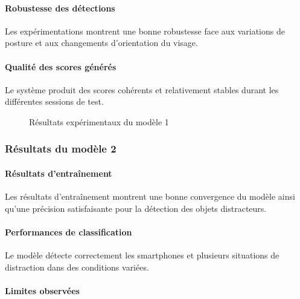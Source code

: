 \paragraph{Robustesse des détections}

Les expérimentations montrent une bonne robustesse face aux variations de posture et aux changements d’orientation du visage.


\paragraph{Qualité des scores générés}

Le système produit des scores cohérents et relativement stables durant les différentes sessions de test.

\begin{figure}[H]
    \centering
    \caption{Résultats expérimentaux du modèle 1}
    \label{fig:results_model1}
\end{figure}

\subsubsection{Résultats du modèle 2}

\paragraph{Résultats d’entraînement}

Les résultats d’entraînement montrent une bonne convergence du modèle ainsi qu’une précision satisfaisante pour la détection des objets distracteurs.


\paragraph{Performances de classification}

Le modèle détecte correctement les smartphones et plusieurs situations de distraction dans des conditions variées.


\paragraph{Limites observées}

